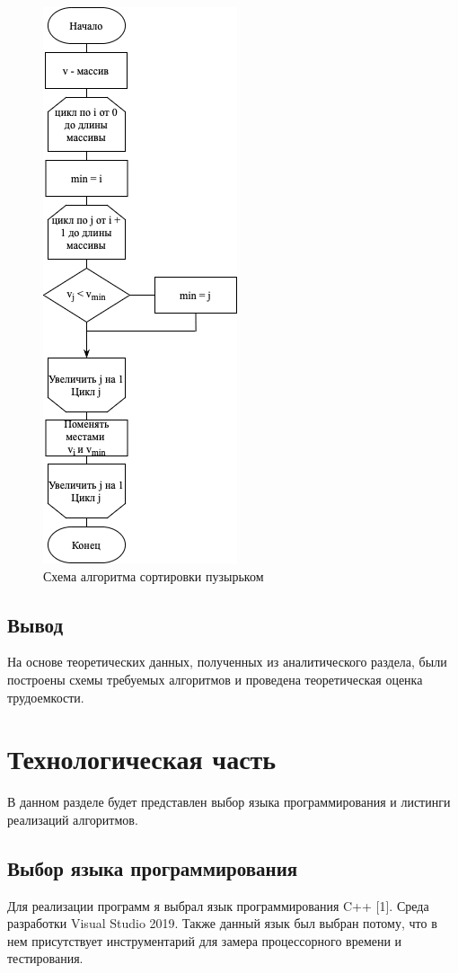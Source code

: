 \documentclass[14pt,russian]{scrartcl}
\begin{document}
\begin{figure}[h]
	\centering
	\includegraphics[scale=1]{selection.png}
	\caption{Схема алгоритма сортировки пузырьком}
	\label{fig:selection}
\end{figure}

\subsection{Вывод}

На основе теоретических данных, полученных из аналитического раздела, были построены схемы требуемых алгоритмов и проведена теоретическая оценка трудоемкости.

\section{Технологическая часть}

В данном разделе будет представлен выбор языка программирования и листинги реализаций алгоритмов.

\subsection{Выбор языка программирования}
Для реализации программ я выбрал язык программирования C++ [1]. Среда разработки Visual Studio 2019. Также данный язык был выбран потому, что в нем присутствует инструментарий для замера процессорного времени и тестирования.
\end{document}

